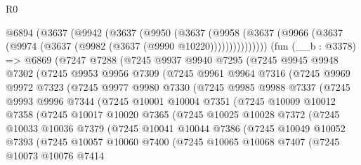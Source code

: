 \begin{lexlean}{R0}
\begin{coremodule}
    @6894
      (@3637
        (@9942
          (@3637
            (@9950
              (@3637
                (@9958 (@3637 (@9966 (@3637 (@9974 (@3637 (@9982 (@3637 (@9990 @10220)))))))))))))))
    (fun (__b : @3378) =>
    @6869
      (@7247
        @7288
        (@7245
          @9937
          @9940
          @7295
          (@7245
            @9945
            @9948
            @7302
            (@7245
              @9953
              @9956
              @7309
              (@7245
                @9961
                @9964
                @7316
                (@7245
                  @9969
                  @9972
                  @7323
                  (@7245
                    @9977
                    @9980
                    @7330
                    (@7245
                      @9985
                      @9988
                      @7337
                      (@7245
                        @9993
                        @9996
                        @7344
                        (@7245
                          @10001
                          @10004
                          @7351
                          (@7245
                            @10009
                            @10012
                            @7358
                            (@7245
                              @10017
                              @10020
                              @7365
                              (@7245
                                @10025
                                @10028
                                @7372
                                (@7245
                                  @10033
                                  @10036
                                  @7379
                                  (@7245
                                    @10041
                                    @10044
                                    @7386
                                    (@7245
                                      @10049
                                      @10052
                                      @7393
                                      (@7245
                                        @10057
                                        @10060
                                        @7400
                                        (@7245
                                          @10065
                                          @10068
                                          @7407
                                          (@7245
                                            @10073
                                            @10076
                                            @7414

\end{coremodule}
\end{lexlean}
